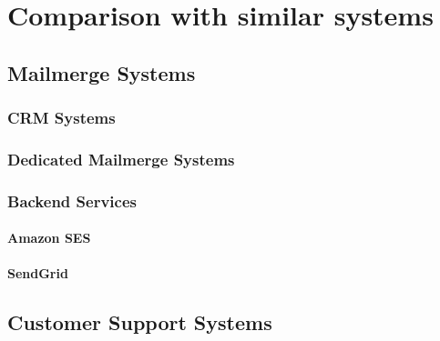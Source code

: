 \chapter{Comparison with similar systems}
\label{chapter:Comparison}

\section{Mailmerge Systems}

\subsection{CRM Systems}

\subsection{Dedicated Mailmerge Systems}

\subsection{Backend Services}

\subsubsection{Amazon SES}
\subsubsection{SendGrid}


\section{Customer Support Systems}
